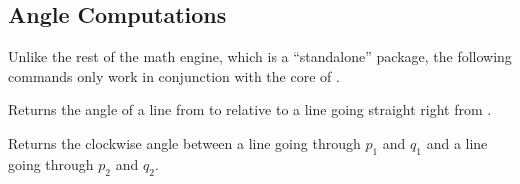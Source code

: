 \subsection{Angle Computations}

Unlike the rest of the math engine, which is a ``standalone'' package,
the following commands only work in conjunction with the core of
\pgfname.



\begin{command}{\pgfmathanglebetweenpoints{}}
  Returns the angle of a line from  to  relative to a
  line going straight right from .
  
\begin{codeexample}[]
\pgfmathanglebetweenpoints{\pgfpoint{1cm}{3cm}}{\pgfpoint{2cm}{4cm}}
\pgfmathresult
\end{codeexample}
\end{command}

\begin{command}{\pgfmathanglebetweenlines{}}
  Returns the clockwise angle between a line going through $p_1$ and
  $q_1$ and a line going through $p_2$ and $q_2$.
  
\begin{codeexample}[]
\pgfmathanglebetweenlines{\pgfpoint{1cm}{3cm}}{\pgfpoint{2cm}{4cm}}
                         {\pgfpoint{0cm}{1cm}}{\pgfpoint{1cm}{0cm}}  
\pgfmathresult
\end{codeexample}
\end{command}
